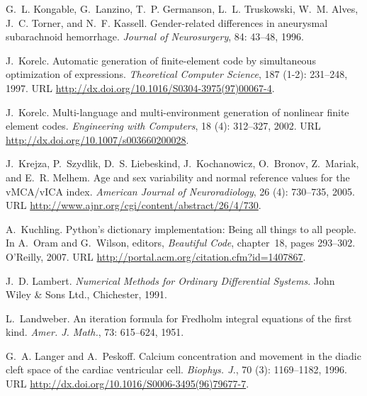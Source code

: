 \begin{thebibliography}{467}
G.~L. Kongable, G.~Lanzino, T.~P. Germanson, L.~L. Truskowski, W.~M. Alves,
  J.~C. Torner, and N.~F. Kassell.
\newblock Gender-related differences in aneurysmal subarachnoid hemorrhage.
\newblock \emph{Journal of Neurosurgery}, 84: 43--48, 1996.

J.~Korelc.
\newblock Automatic generation of finite-element code by simultaneous
  optimization of expressions.
\newblock \emph{Theoretical Computer Science}, 187 (1-2):
  231--248, 1997.
\newblock URL \url{http://dx.doi.org/10.1016/S0304-3975(97)00067-4}.

J.~Korelc.
\newblock Multi-language and multi-environment generation of nonlinear finite
  element codes.
\newblock \emph{Engineering with Computers}, 18 (4):
  312--327, 2002.
\newblock URL \url{http://dx.doi.org/10.1007/s003660200028}.

J.~Krejza, P.~Szydlik, D.~S. Liebeskind, J.~Kochanowicz, O.~Bronov, Z.~Mariak,
  and E.~R. Melhem.
\newblock Age and sex variability and normal reference values for the
  {vMCA/vICA} index.
\newblock \emph{American Journal of Neuroradiology}, 26 (4):
  730--735, 2005.
\newblock URL \url{http://www.ajnr.org/cgi/content/abstract/26/4/730}.

A.~Kuchling.
\newblock Python's dictionary implementation: Being all things to all people.
\newblock In A.~Oram and G.~Wilson, editors, \emph{Beautiful Code}, chapter~18,
  pages 293--302. O'Reilly, 2007.
\newblock URL \url{http://portal.acm.org/citation.cfm?id=1407867}.

J.~D. Lambert.
\newblock \emph{Numerical Methods for Ordinary Differential Systems}.
\newblock John Wiley \& Sons Ltd., Chichester, 1991.

L.~Landweber.
\newblock An iteration formula for {F}redholm integral equations of the first
  kind.
\newblock \emph{Amer. J. Math.}, 73: 615--624, 1951.

G.~A. Langer and A.~Peskoff.
\newblock Calcium concentration and movement in the diadic cleft space of the
  cardiac ventricular cell.
\newblock \emph{Biophys. J.}, 70 (3): 1169--1182, 1996.
\newblock URL \url{http://dx.doi.org/10.1016/S0006-3495(96)79677-7}.


\end{thebibliography}
